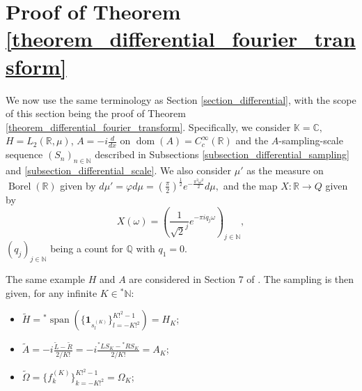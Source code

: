 \documentclass{amsart}
\theoremstyle{definition}
\theoremstyle{remark}
\def \Span{\operatorname{span}}
\def \Dom{\operatorname{dom}}
\def \St{\operatorname{st}}
\def \Borel{\operatorname{Borel}}
\def \HOM{\hat{\Omega}}
\def \HMU{\hat{\mu}}
\def \HNU{\hat{\nu}}
\def \HU{\hat{U}}
\begin{document}



\section{Proof of Theorem \ref{theorem_differential_fourier_transform}}\label{appendix_differential}

We now use the same terminology as Section \ref{section_differential}, with the scope of this section being the proof of Theorem \ref{theorem_differential_fourier_transform}. Specifically, we consider $\mathbb{K}=\mathbb{C},$ $H=L_2(\mathbb{R},\mu)$, $A=-i\frac{d}{dx}$ on $\Dom(A)=C_c^{{\infty}}(\mathbb{R})$ and the $A$-sampling-scale sequence $(S_n)_{n\in\mathbb{N}}$ described in Subsections  \ref{subsection_differential_sampling} and \ref{subsection_differential_scale}. We also consider $\mu'$ as the measure on $\Borel(\mathbb{R})$ given by $d\mu'=\varphi d\mu=\left(\frac{\pi}{2}\right)^{\frac{1}{2}}e^{-\frac{\pi^2\omega^2}{2}}d\mu,$ and the map $X:\mathbb{R}\rightarrow Q$ given by $$X(\omega)=\left(\frac{1}{\sqrt{2}^j}e^{-\pi i q_j \omega}\right)_{j\in\mathbb{N}},$$ $(q_j)_{j\in\mathbb{N}}$ being a count for $\mathbb{Q}$ with $q_1=0.$

The same example $H$ and $A$ are considered in Section 7 of \cite{nonez2024spectralequivalencesnonstandardsamplings}. The sampling is then given, for any infinite $K\in{}^*\mathbb{N}:$
\begin{itemize}
	\item $\tilde{H}={}^*\Span(\{\mathbf{1}_{s_l^{(K)}}\}_{l=-K!^2}^{K!^2-1})=H_K$;
	\item $\tilde{A}=-i\frac{\tilde{L}-\tilde{R}}{2/K!}=-i\frac{{}^*LS_K-{}^*RS_K}{2/K!}=A_K$;
	\item $\tilde{\Omega}=\{f_k^{(K)}\}_{k=-K!^2}^{K!^2-1}=\Omega_K$;
\end{itemize}
\end{document}
